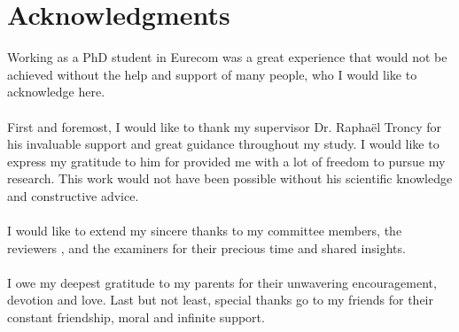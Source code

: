 \chapter*{Acknowledgments}

Working as a PhD student in Eurecom was a great experience that would not be achieved without the help and support of many people, who I would like to acknowledge here.
\\
\\
First and foremost, I would like to thank my supervisor Dr. Rapha\"el Troncy for his invaluable support and great guidance throughout my study. I would like to express my gratitude to him for provided me with a lot of freedom to pursue my research. This work would not have been possible without his scientific knowledge and constructive advice.
\\
\\
I would like to extend my sincere thanks to my committee members, the reviewers , and the examiners for their precious time and shared insights.
\\
\\
I owe my deepest gratitude to my parents for their unwavering encouragement, devotion and love.  Last but not least, special thanks go to my friends for their constant friendship, moral and infinite support.

